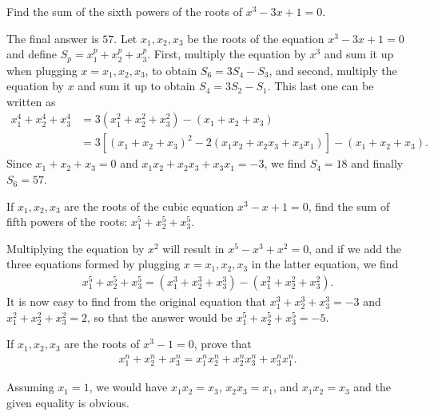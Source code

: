 \begin{question}
    Find the sum of the sixth powers of the roots of $x^3-3x+1=0$.
\end{question}

\begin{solution}[name=Soluion by Parviz Shahriari]
    The final answer is $57$. Let $x_1,x_2,x_3$ be the roots of the equation $x^3-3x+1=0$ and define $S_p=x_1^p+x_2^p+x_3^p$. First, multiply the equation by $x^3$ and sum it up when plugging $x=x_1,x_2,x_3$, to obtain $S_6=3S_4-S_3$, and second, multiply the equation by $x$ and sum it up to obtain $S_4=3S_2-S_1$. This last one can be written as
    \begin{align*}
        x_1^4+x_2^4+x_3^4 &= 3(x_1^2+x_2^2+x_3^2) - (x_1+x_2+x_3)\\
        &= 3\left[(x_1+x_2+x_3)^2-2(x_1x_2+x_2x_3+x_3x_1)\right] - (x_1+x_2+x_3).
    \end{align*}
    Since $x_1+x_2+x_3=0$ and $x_1x_2+x_2x_3+x_3x_1=-3$, we find $S_4=18$ and finally $S_6=57$.
\end{solution}

\begin{question}
    If $x_1,x_2,x_3$ are the roots of the cubic equation $x^3-x+1=0$, find the sum of fifth powers of the roots: $x_1^5+x_2^5+x_3^5$.
\end{question}

\begin{solution}
    Multiplying the equation by $x^2$ will result in $x^5-x^3+x^2=0$, and if we add the three equations formed by plugging $x=x_1,x_2,x_3$ in the latter equation, we find
    \begin{align*}
        x_1^5+x_2^5+x_3^5 = (x_1^3+x_2^3+x_3^3) - (x_1^2+x_2^2+x_3^2).
    \end{align*}
    It is now easy to find from the original equation that $x_1^3+x_2^3+x_3^3=-3$ and $x_1^2+x_2^2+x_3^2=2$, so that the answer would be $x_1^5+x_2^5+x_3^5=-5$.
\end{solution}


\begin{question}
    If $x_1,x_2,x_3$ are the roots of $x^3-1=0$, prove that
    \begin{align*}
        x_1^n+x_2^n+x_3^n = x_1^nx_2^n + x_2^nx_3^n + x_3^nx_1^n.
    \end{align*}
\end{question}

\begin{solution}
    Assuming $x_1=1$, we would have $x_1x_2=x_3$, $x_2x_3=x_1$, and $x_1x_2=x_3$ and the given equality is obvious.
\end{solution}


